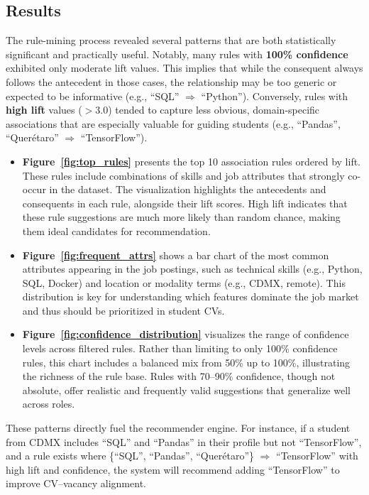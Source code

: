 \documentclass[runningheads]{llncs}
\begin{document}
	\subsection{Results}
	
	The rule-mining process revealed several patterns that are both statistically significant and practically useful. Notably, many rules with \textbf{100\% confidence} exhibited only moderate lift values. This implies that while the consequent always follows the antecedent in those cases, the relationship may be too generic or expected to be informative (e.g., “SQL” $\Rightarrow$ “Python”). Conversely, rules with \textbf{high lift} values ($> 3.0$) tended to capture less obvious, domain-specific associations that are especially valuable for guiding students (e.g., “Pandas”, “Querétaro” $\Rightarrow$ “TensorFlow”).
	
	\begin{itemize}
		\item \textbf{Figure~\ref{fig:top_rules}} presents the top 10 association rules ordered by lift. These rules include combinations of skills and job attributes that strongly co-occur in the dataset. The visualization highlights the antecedents and consequents in each rule, alongside their lift scores. High lift indicates that these rule suggestions are much more likely than random chance, making them ideal candidates for recommendation.
		
		\item \textbf{Figure~\ref{fig:frequent_attrs}} shows a bar chart of the most common attributes appearing in the job postings, such as technical skills (e.g., Python, SQL, Docker) and location or modality terms (e.g., CDMX, remote). This distribution is key for understanding which features dominate the job market and thus should be prioritized in student CVs.
		
		\item \textbf{Figure~\ref{fig:confidence_distribution}} visualizes the range of confidence levels across filtered rules. Rather than limiting to only 100\% confidence rules, this chart includes a balanced mix from 50\% up to 100\%, illustrating the richness of the rule base. Rules with 70–90\% confidence, though not absolute, offer realistic and frequently valid suggestions that generalize well across roles.
	\end{itemize}
	These patterns directly fuel the recommender engine. For instance, if a student from CDMX includes “SQL” and “Pandas” in their profile but not “TensorFlow”, and a rule exists where \{“SQL”, “Pandas”, “Querétaro”\} $\Rightarrow$ “TensorFlow” with high lift and confidence, the system will recommend adding “TensorFlow” to improve CV–vacancy alignment.
	
\end{document}
